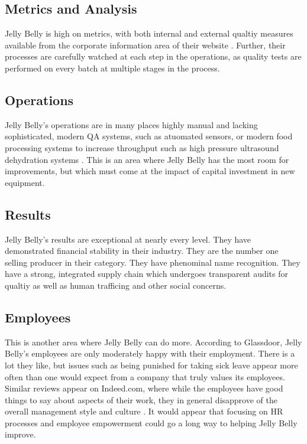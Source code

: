 \documentclass[man]{apa7}
\begin{document}
\subsection{Metrics and Analysis}
\label{sec:org9e85e6a}

Jelly Belly is high on metrics, with both internal and external qualtiy measures available from the corporate information area of their website \parencite{ jellybellyOfficialSiteJelly}. Further, their processes are carefully watched at each step in the operations, as quality tests are performed on every batch at multiple stages in the process. \parencite{associationDiagnosticStatisticalManual2013}

\subsection{Operations}
\label{sec:org0cda1a5}

Jelly Belly's operations are in many places highly manual and lacking sophisticated, modern QA systems, such as atuomated sensors, or modern food processing systems to increase throughput such as high pressure ultrasound dehydration systems \parencite{zhangEffectsUltrahighPressure2020}. This is an area where Jelly Belly has the most room for improvements, but which must come at the impact of capital investment in new equipment.

\subsection{Results}
\label{sec:org396ee21}

Jelly Belly's results are exceptional at nearly every level. They have demonstrated financial stability in their industry. They are the number one selling producer in their category. They have phenominal name recognition. They have a strong, integrated supply chain which undergoes transparent audits for qualtiy as well as human trafficing and other social concerns.

\subsection{Employees}
\label{sec:org79d1b8f}

This is another area where Jelly Belly can do more. According to Glassdoor, Jelly Belly's employees are only moderately happy with their employment. There is a lot they like, but issues such as being punished for taking sick leave appear more often than one would expect from a company that truly values its employees.  Similar reviews appear on Indeed.com, where while the employees have good things to say about aspects of their work, they in general disapprove of the overall management style and culture \parencite{glassdoorJellyBellyCandy, indeed.comWorkingJellyBelly}. It would appear that focusing on HR processes and employee empowerment could go a long way to helping Jelly Belly improve.
\end{document}

